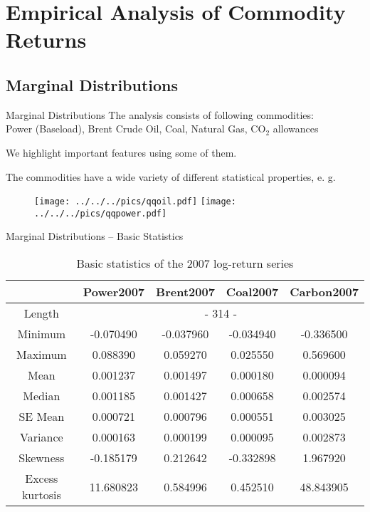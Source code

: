 \section{Empirical Analysis of Commodity Returns}
\subsection{Marginal Distributions}

{Marginal Distributions}
The analysis consists of following commodities:\\
Power (Baseload), Brent Crude Oil, Coal, Natural Gas, CO$_2$
allowances

We highlight important features using some of them.

The commodities have a wide variety of different statistical
properties, e. g.
\begin{center}
\begin{figure}
\texttt{[image: ../../../pics/qqoil.pdf]}
\texttt{[image: ../../../pics/qqpower.pdf]}
\end{figure}
\end{center}

{Marginal Distributions -- Basic Statistics}
{\small
\begin{table}[ht]
            \vspace{0.5cm}
            \begin{center}
                \begin{tabular}{c|c|c|c|c}
                    &Power2007&Brent2007&Coal2007&Carbon2007\\\hline
                    Length&\multicolumn{4}{c}{- 314 -}\\
                    Minimum&-0.070490&-0.037960&-0.034940&-0.336500\\
                    Maximum&0.088390&0.059270&0.025550&0.569600\\
                    Mean&0.001237&0.001497&0.000180&0.000094\\
                    Median&0.001185&0.001427&0.000658&0.002574\\
                    SE Mean&0.000721&0.000796&0.000551&0.003025\\
                    Variance&0.000163&0.000199&0.000095&0.002873\\
                    Skewness&-0.185179&0.212642&-0.332898&1.967920\\
                    Excess kurtosis&11.680823&0.584996&0.452510&48.843905\\
                \end{tabular}
                \caption{Basic statistics of the 2007 log-return series}
            \end{center}
        \end{table}
}

